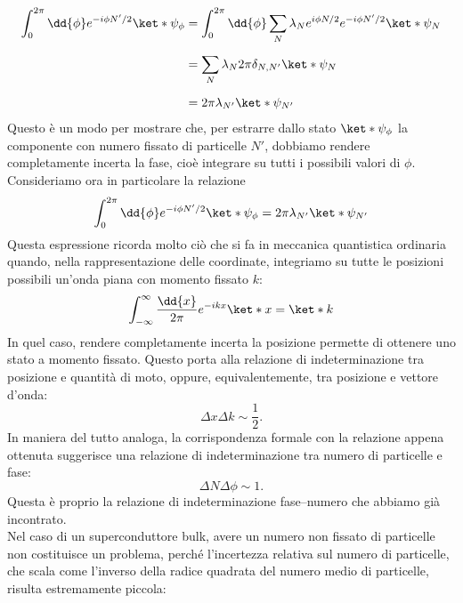 \begin{equation*}
    \begin{split}
        \int_0^{2\pi}
        \dd{\phi}
        e^{-i\phi N'/2}
        \ket*{\psi_{\phi}}
        &=
        \int_0^{2\pi}
        \dd{\phi}
        \sum_N
        \lambda_N
        e^{i\phi N/2}
        e^{-i\phi N'/2}
        \ket*{\psi_N}
        \\[0.2cm]
        &=
        \sum_N
        \lambda_N
        2\pi
        \delta_{N,N'}
        \ket*{\psi_N}
        \\[0.2cm]
        &=
        2\pi
        \lambda_{N'}
        \ket*{\psi_{N'}}
    \end{split}
\end{equation*}
Questo è un modo per mostrare che, per estrarre dallo stato $\ket*{\psi_{\phi}}$ la componente con numero fissato di particelle $N'$, dobbiamo rendere completamente incerta la fase, cioè integrare su tutti i possibili valori di $\phi$.\\
Consideriamo ora in particolare la relazione
\begin{equation*}
    \int_0^{2\pi}
    \dd{\phi}
    e^{-i\phi N'/2}
    \ket*{\psi_{\phi}}
    =
    2\pi
    \lambda_{N'}
    \ket*{\psi_{N'}}
\end{equation*}
Questa espressione ricorda molto ciò che si fa in meccanica quantistica ordinaria quando, nella rappresentazione delle coordinate, integriamo su tutte le posizioni possibili un'onda piana con momento fissato $k$:
\begin{equation*}
    \int_{-\infty}^{\infty}
    \frac{\dd{x}}{2\pi}
    e^{-ikx}
    \ket*{x}
    =
    \ket*{k}
\end{equation*}
In quel caso, rendere completamente incerta la posizione permette di ottenere uno stato a momento fissato. Questo porta alla relazione di indeterminazione tra posizione e quantità di moto, oppure, equivalentemente, tra posizione e vettore d'onda:
\[
\Delta x \Delta k \sim \frac{1}{2}.
\]
In maniera del tutto analoga, la corrispondenza formale con la relazione appena ottenuta suggerisce una relazione di indeterminazione tra numero di particelle e fase:
\[
\Delta N \Delta\phi \sim 1.
\]
Questa è proprio la relazione di indeterminazione fase--numero che abbiamo già incontrato.\\
Nel caso di un superconduttore bulk, avere un numero non fissato di particelle non costituisce un problema, perché l'incertezza relativa sul numero di particelle, che scala come l'inverso della radice quadrata del numero medio di particelle, risulta estremamente piccola:

